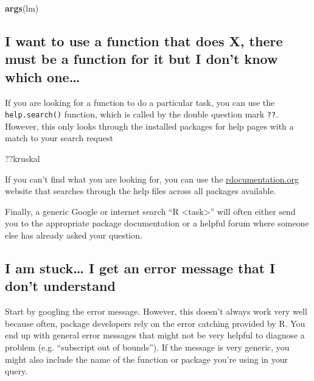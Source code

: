 \documentclass[]{book}
\newenvironment{Shaded}{\begin{snugshade}}{\end{snugshade}}
\newcommand{\KeywordTok}[1]{\textcolor[rgb]{0.13,0.29,0.53}{\textbf{#1}}}
\newcommand{\NormalTok}[1]{#1}
\begin{document}
\begin{Shaded}
\begin{Highlighting}[]
\KeywordTok{args}\NormalTok{(lm)}
\end{Highlighting}
\end{Shaded}

\subsection{I want to use a function that does X, there must be a
function for it but I don't know which
one\ldots{}}\label{i-want-to-use-a-function-that-does-x-there-must-be-a-function-for-it-but-i-dont-know-which-one}

If you are looking for a function to do a particular task, you can use
the \texttt{help.search()} function, which is called by the double
question mark \texttt{??}. However, this only looks through the
installed packages for help pages with a match to your search request

\begin{Shaded}
\begin{Highlighting}[]
\NormalTok{??kruskal}
\end{Highlighting}
\end{Shaded}

If you can't find what you are looking for, you can use the
\href{http://www.rdocumentation.org}{rdocumentation.org} website that
searches through the help files across all packages available.

Finally, a generic Google or internet search ``R
\textless{}task\textgreater{}'' will often either send you to the
appropriate package documentation or a helpful forum where someone else
has already asked your question.

\subsection{I am stuck\ldots{} I get an error message that I don't
understand}\label{i-am-stuck-i-get-an-error-message-that-i-dont-understand}

Start by googling the error message. However, this doesn't always work
very well because often, package developers rely on the error catching
provided by R. You end up with general error messages that might not be
very helpful to diagnose a problem (e.g. ``subscript out of bounds'').
If the message is very generic, you might also include the name of the
function or package you're using in your query.
\end{document}
